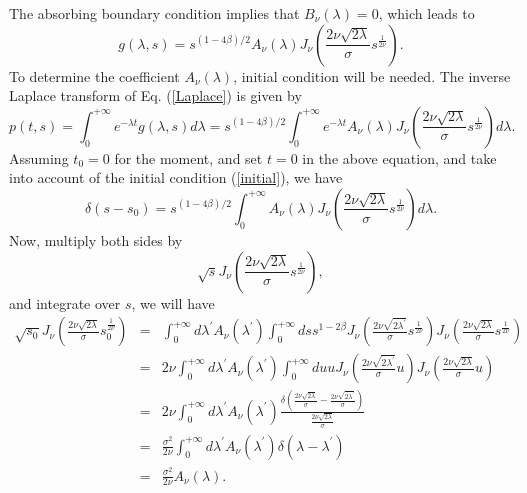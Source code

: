 \documentclass[12pt]{article}
\begin{document}
  The absorbing boundary condition implies that $B_{\nu}(\lambda)=0$, which leads to
  \begin{equation}
    g(\lambda, s)=s^{(1-4\beta)/2}A_{\nu}(\lambda)J_{\nu}\left(\frac{2\nu\sqrt{2\lambda}}{\sigma}s^{\frac{1}{2\nu}}\right).
  \end{equation}
  To determine the coefficient $A_{\nu}(\lambda)$, initial condition will be needed. The inverse Laplace transform of Eq.
  (\ref{Laplace}) is given by
  \begin{equation}
    p(t,s)=\int_0^{+\infty}e^{-\lambda t}g(\lambda,s)d\lambda
          =s^{(1-4\beta)/2}\int_0^{+\infty}e^{-\lambda t}
          A_{\nu}(\lambda)J_{\nu}\left(\frac{2\nu\sqrt{2\lambda}}{\sigma}s^{\frac{1}{2\nu}}\right)d\lambda.
  \end{equation}
  Assuming $t_0=0$ for the moment, and set $t=0$ in the above equation, and take into account of the initial condition
  (\ref{initial}), we have
  \begin{equation}
    \delta(s-s_0)=s^{(1-4\beta)/2}\int_0^{+\infty}
          A_{\nu}(\lambda)J_{\nu}\left(\frac{2\nu\sqrt{2\lambda}}{\sigma}s^{\frac{1}{2\nu}}\right)d\lambda.
  \end{equation}
  Now, multiply both sides by
  $$
    \sqrt{s}J_{\nu}\left(\frac{2\nu\sqrt{2\lambda}}{\sigma}s^{\frac{1}{2\nu}}\right),
  $$
  and integrate over $s$, we will have
  \begin{eqnarray}
      \sqrt{s_0}J_{\nu}\left(\frac{2\nu\sqrt{2\lambda}}{\sigma}s_0^{\frac{1}{2\nu}}\right)
    &=&  \int_0^{+\infty}d\lambda^{\prime} A_{\nu}(\lambda^{\prime})
         \int_0^{+\infty}ds s^{1-2\beta}
         J_{\nu}\left(\frac{2\nu\sqrt{2\lambda^{\prime}}}{\sigma}s^{\frac{1}{2\nu}}\right)
         J_{\nu}\left(\frac{2\nu\sqrt{2\lambda}}{\sigma}s^{\frac{1}{2\nu}}\right)\nonumber\\
    &=& 2\nu \int_0^{+\infty}d\lambda^{\prime} A_{\nu}(\lambda^{\prime})
         \int_0^{+\infty}du u
         J_{\nu}\left(\frac{2\nu\sqrt{2\lambda^{\prime}}}{\sigma}u\right)
         J_{\nu}\left(\frac{2\nu\sqrt{2\lambda}}{\sigma}u\right) \nonumber\\
    &=& 2\nu \int_0^{+\infty}d\lambda^{\prime} A_{\nu}(\lambda^{\prime})
          \frac{\displaystyle \delta\left(\frac{2\nu\sqrt{2\lambda}}{\sigma} - \frac{2\nu\sqrt{2\lambda^{\prime}}}{\sigma}\right)}
            {\displaystyle \frac{2\nu\sqrt{2\lambda}}{\sigma}}\nonumber\\
    &=& \frac{\sigma^2}{2\nu}\int_0^{+\infty}d\lambda^{\prime} A_{\nu}(\lambda^{\prime})
          \delta(\lambda - \lambda^{\prime})\nonumber\\
    &=& \frac{\sigma^2}{2\nu}A_{\nu}(\lambda).
  \end{eqnarray}
\end{document}
